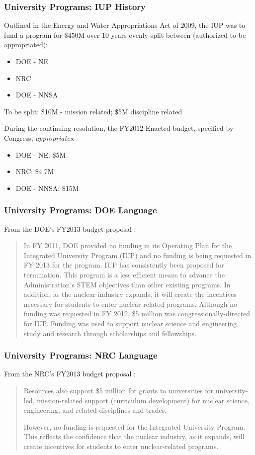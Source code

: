 \begin{frame}[ctb!]
  \frametitle{University Programs: IUP History}
  Outlined in the Energy and Water Appropriations Act of
  2009, the IUP was to fund a program for \$450M over 10 
  years evenly split between (authorized to be appropriated):
  \begin{itemize}
    \item DOE - NE
    \item NRC
    \item DOE - NNSA
  \end{itemize}
  To be split: \$10M - mission related; \$5M discipline related
  \vspace{0.3cm}
  \pause
  
  During the continuing resolution, the FY2012 Enacted budget,
  specified by Congress, \emph{appropriates}:
  \begin{itemize}
    \item DOE - NE: \$5M
    \item NRC: \$4.7M
    \item DOE - NNSA: \$15M
  \end{itemize}
\end{frame}


\begin{frame}[ctb!]
  \frametitle{University Programs: DOE Language}  
  From the DOE's FY2013 budget proposal \cite{doe_budget_2013}:
  \begin{quote}
    In FY 2011, DOE provided no funding in its Operating Plan 
    for the Integrated University Program (IUP) and no funding 
    is being requested in FY 2013 for the program.  IUP has 
    consistently been proposed for termination.  This program is 
    a less efficient means to advance the Administration’s STEM 
    objectives than other existing programs.  In addition, as the 
    nuclear industry expands, it will create the incentives 
    necessary for students to enter nuclear-related programs. 
    Although no funding was requested in FY 2012, \$5 million was 
    congressionally-directed for IUP.  Funding was used to support 
    nuclear science and engineering study and research through 
    scholarships and fellowships. 
  \end{quote}
\end{frame}

\begin{frame}[ctb!]
  \frametitle{University Programs: NRC Language}  
  From the NRC's FY2013 budget proposal \cite{nrc_budget_2013}:
  \begin{quote}
    Resources also support \$5 million for grants to universities 
    for university-led, mission-related support (curriculum development) 
    for nuclear science, engineering, and related disciplines and trades.

    However, no funding is requested for the Integrated University Program.  
    This reflects the confidence that the nuclear industry, as it expands, 
    will create incentives for students to enter nuclear-related programs.
  \end{quote}
\end{frame}


